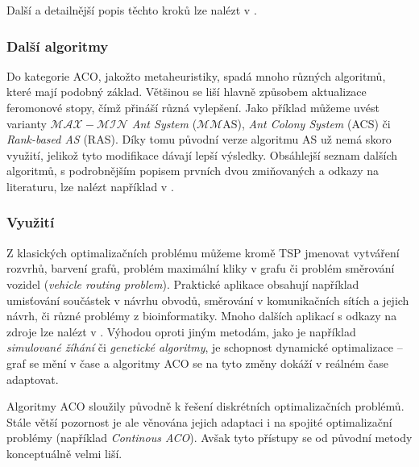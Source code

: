 \documentclass[a4paper,12pt]{article}
\begin{document}
Další a detailnější popis těchto kroků lze nalézt v \cite{Blum08SwarmOpt}.


\subsubsection{Další algoritmy}
Do kategorie ACO, jakožto metaheuristiky, spadá mnoho různých algoritmů, které mají podobný základ. Většinou se
liší hlavně způsobem aktualizace feromonové stopy, čímž přináší různá vylepšení. Jako příklad můžeme uvést
varianty {\it $\mathcal{MAX-MIN}$ Ant System} ($\mathcal{MM}$AS), {\it Ant Colony System} (ACS) či
{\it Rank-based AS} (RAS). Díky tomu původní verze algoritmu AS už nemá skoro využití, jelikož tyto modifikace
dávají lepší výsledky. Obsáhlejší seznam dalších algoritmů, s podrobnějším popisem prvních dvou zmiňovaných
a odkazy na literaturu, lze nalézt například v \cite{Dorigo06antcolony}.

\subsubsection{Využití}
Z klasických optimalizačních problému můžeme kromě TSP jmenovat vytváření rozvrhů,
barvení grafů, problém maximální kliky v grafu či problém směrování vozidel ({\it vehicle routing problem}).
Praktické aplikace obsahují například
umisťování součástek v návrhu obvodů, směrování v komunikačních sítích a jejich návrh, či různé problémy
z bioinformatiky. Mnoho dalších aplikací s odkazy na zdroje lze nalézt v \cite{Blum08SwarmOpt}.
Výhodou oproti jiným metodám, jako je například {\it simulované žíhání} či {\it genetické algoritmy}, je
schopnost dynamické optimalizace -- graf se mění v čase a algoritmy ACO se na tyto změny dokáží v reálném
čase adaptovat.

Algoritmy ACO sloužily původně k řešení diskrétních optimalizačních problémů. Stále větší pozornost je
ale věnována jejich adaptaci i na spojité optimalizační problémy (například {\it Continous ACO}).
Avšak tyto přístupy se od původní metody konceptuálně velmi liší.
\end{document}
